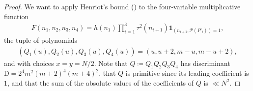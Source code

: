 \documentclass[12pt]{amsart}
\theoremstyle{definition}
\theoremstyle{remark}
\numberwithin{equation}{section}
\newcommand{\1}{\mathbf{1}}
\begin{document}
\begin{proof} 
    We want to apply Henriot's bound (\cite[Corollary 1]{henriot}) to the four-variable multiplicative function 
    \begin{align*}
        F(n_1,n_2,n_3,n_4)=h(n_1) \prod_{i=1}^3 \tau^2(n_{i+1}) \1_{(n_{i+1},\mathcal{P}(P'_i))=1},
    \end{align*}
    the tuple of polynomials 
    \begin{align*}
        (Q_1(u),Q_2(u),Q_3(u),Q_4(u))=(u,u+2,m-u,m-u+2),
    \end{align*}
    and with choices $x=y=N/2$. Note that $Q\coloneqq Q_1Q_2Q_3Q_4$ has discriminant $\mathrm{D}=2^4m^2(m+2)^4(m+4)^2$, that $Q$ is primitive since its leading coefficient is $1$, and that the sum of the absolute values of the coefficients of $Q$ is $\ll N^2$.
    

\end{proof}
\end{document}
